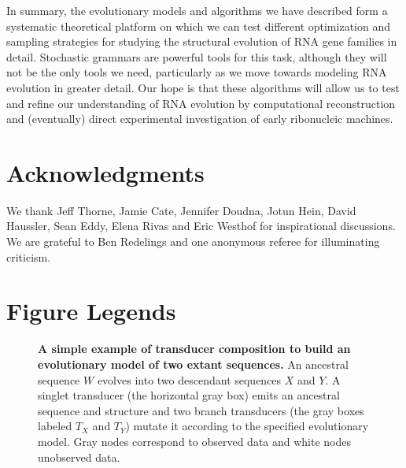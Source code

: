 \documentclass[10pt]{article}
\begin{document}
In summary, the evolutionary models and algorithms we have described form a
systematic theoretical platform on which we can test different optimization and sampling strategies
for studying the structural evolution of RNA gene families in detail.
Stochastic grammars are powerful tools for this task, although they will not be the only tools we need,
particularly as we move towards modeling RNA evolution in greater detail.
Our hope is that these algorithms will allow us to test and refine our
understanding of RNA evolution by computational reconstruction and (eventually)
direct experimental investigation of early ribonucleic machines.











\newpage
\section*{Acknowledgments}

We thank
Jeff Thorne,
Jamie Cate,
Jennifer Doudna,
Jotun Hein,
David Haussler,
Sean Eddy,
Elena Rivas and
Eric Westhof
for inspirational discussions.
We are grateful to Ben Redelings and one anonymous referee for illuminating criticism.




\clearpage
\section*{Figure Legends}

\begin{figure}[!ht]
  \centering
   \caption{
     \textbf{A simple example of transducer composition to build an
       evolutionary model of two extant sequences.}
    An ancestral sequence $W$ evolves into two descendant sequences $X$ and $Y$.
     A singlet transducer (the horizontal gray box) emits an ancestral sequence and structure
     and two branch transducers (the gray boxes labeled $T_X$ and $T_Y$)
     mutate it according to the specified evolutionary model.
     Gray nodes correspond to observed data and white nodes unobserved data.
   }
 \end{figure}
 
\end{document}
